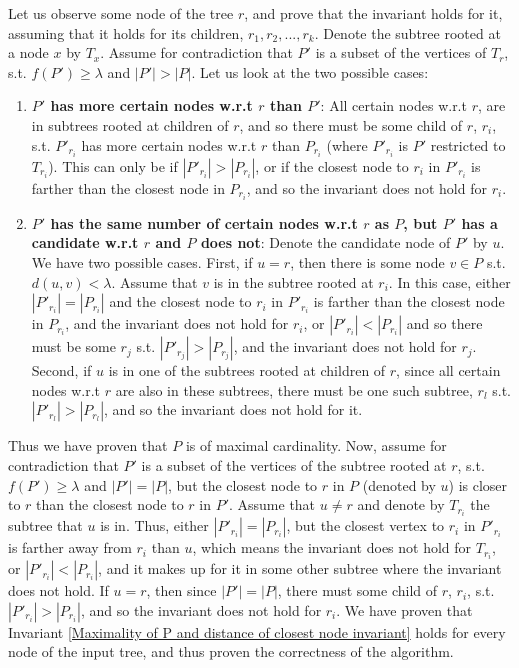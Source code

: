 \documentclass[11pt,a4paper]{article}
\theoremstyle{definition}
\theoremstyle{remark}
\begin{document}
Let us observe some node of the tree $r$, and prove that the invariant holds for it, assuming that it holds for its children, $r_{1},r_{2},...,r_{k}$. Denote the subtree rooted at a node $x$ by $T_x$. Assume for contradiction that $P'$ is a subset of the vertices of $T_r$, s.t. $f(P')\geq\lambda$ and $|P'| > |P|$. Let us look at the two possible cases:
\begin{enumerate}
\item \textbf{\boldmath$P'$ has more certain nodes w.r.t \boldmath$r$ than \boldmath$P'$}: All certain nodes w.r.t $r$, are in subtrees rooted at children of $r$, and so there must be some child of $r$, $r_i$, s.t. $P'_{r_i}$ has more certain nodes w.r.t $r$ than $P_{r_i}$ (where $P'_{r_i}$ is $P'$ restricted to $T_{r_i}$). This can only be if $|P'_{r_i}| > |P_{r_i}|$, or if the closest node to $r_i$ in $P'_{r_i}$ is farther than the closest node in $P_{r_i}$, and so the invariant does not hold for $r_i$.
\item \textbf{\boldmath$P'$ has the same number of certain nodes w.r.t \boldmath$r$ as \boldmath$P$, but \boldmath$P'$ has a candidate w.r.t \boldmath$r$  and \boldmath$P$ does not}: Denote the candidate node of $P'$ by $u$. We have two possible cases. First, if $u=r$, then there is some node $v \in P$ s.t. $d(u,v)<\lambda$. Assume that $v$ is in the subtree rooted at $r_i$. In this case, either $|P'_{r_i}|=|P_{r_i}|$ and the closest node to $r_i$ in $P'_{r_i}$ is farther than the closest node in $P_{r_i}$, and the invariant does not hold for $r_i$, or $|P'_{r_i}|<|P_{r_i}|$ and so there must be some $r_j$ s.t. $|P'_{r_j}|>|P_{r_j}|$, and the invariant does not hold for $r_j$. Second, if $u$ is in one of the subtrees rooted at children of $r$, since all certain nodes w.r.t $r$ are also in these subtrees, there must be one such subtree, $r_l$ s.t. $|P'_{r_l}| > |P_{r_l}|$, and so the invariant does not hold for it.
\end{enumerate} 
Thus we have proven that $P$ is of maximal cardinality. Now, assume for contradiction that $P'$ is a subset of the vertices of the subtree rooted at $r$, s.t. $f(P')\geq\lambda$ and $|P'| = |P|$, but the closest node to $r$ in $P$ (denoted by $u$) is closer to $r$ than the closest node to $r$ in $P'$. Assume that $u \neq r$ and denote by $T_{r_i}$ the subtree that $u$ is in. Thus, either $|P'_{r_i}| = |P_{r_i}|$, but the closest vertex to $r_i$ in $P'_{r_i}$ is farther away from $r_i$ than $u$, which means the invariant does not hold for $T_{r_i}$, or $|P'_{r_i}| < |P_{r_i}|$, and it makes up for it in some other subtree where the invariant does not hold. If $u=r$, then since $|P'| = |P|$, there must some child of $r$, $r_i$, s.t. $|P'_{r_i}| > |P_{r_i}|$, and so the invariant does not hold for $r_i$. We have proven that Invariant \ref{Maximality of P and distance of closest node invariant} holds for every node of the input tree, and thus proven the correctness of the algorithm.
\end{document}
